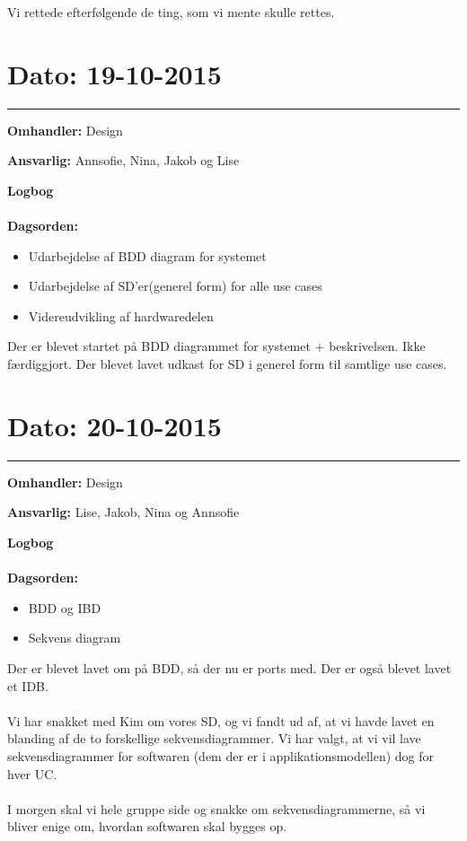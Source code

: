 Vi rettede efterfølgende de ting, som vi mente skulle rettes.

	


\section{Dato: 19-10-2015 }
\hrule

\textbf{Omhandler:} Design 

\textbf{Ansvarlig:} Annsofie, Nina, Jakob og Lise

\textbf{Logbog}
\\
\\
\textbf{Dagsorden:}
\begin{itemize}
	\item Udarbejdelse af BDD diagram for systemet
	\item Udarbejdelse af SD'er(generel form) for alle use cases
	\item Videreudvikling af hardwaredelen
\end{itemize}

Der er blevet startet på BDD diagrammet for systemet + beskrivelsen. Ikke færdiggjort.
Der blevet lavet udkast for SD i generel form til samtlige use cases. 




\section{Dato: 20-10-2015 }
\hrule

\textbf{Omhandler:} Design 

\textbf{Ansvarlig:} Lise, Jakob, Nina og Annsofie

\textbf{Logbog}
\\
\\
\textbf{Dagsorden:}
\begin{itemize}
	\item BDD og IBD
	\item Sekvens diagram
\end{itemize}

Der er blevet lavet om på BDD, så der nu er ports med. Der er også blevet lavet et IDB. 
\\ \\
Vi har snakket med Kim om vores SD, og vi fandt ud af, at vi havde lavet en blanding af de to forskellige sekvensdiagrammer. Vi har valgt, at vi vil lave sekvensdiagrammer for softwaren (dem der er i applikationsmodellen) dog for hver UC.
\\ \\
I morgen skal vi hele gruppe side og snakke om sekvensdiagrammerne, så vi bliver enige om, hvordan softwaren skal bygges op.  
	
